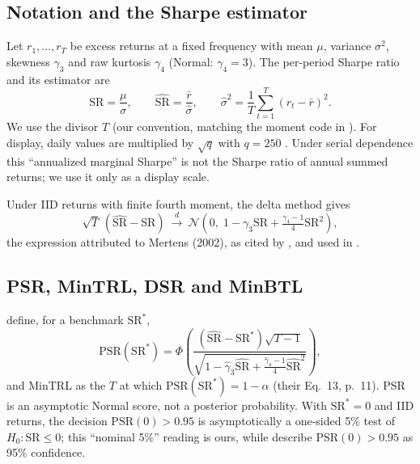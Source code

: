 \documentclass[11pt,a4paper]{article}
\newcommand{\SR}{\mathrm{SR}}
\newcommand{\hSR}{\widehat{\mathrm{SR}}}
\theoremstyle{remark}
\begin{document}
\subsection{Notation and the Sharpe estimator}
Let $r_1,\dots,r_T$ be excess returns at a fixed frequency with mean $\mu$, variance $\sigma^2$, skewness $\gamma_3$ and raw kurtosis $\gamma_4$ (Normal: $\gamma_4=3$). The per-period Sharpe ratio and its estimator are
\begin{equation}\label{eq:sr}
\SR=\frac{\mu}{\sigma},\qquad \hSR=\frac{\bar r}{\hat\sigma},\qquad \hat\sigma^2=\frac1T\sum_{t=1}^T(r_t-\bar r)^2 .
\end{equation}
We use the divisor $T$ (our convention, matching the moment code in \citealp[App.~A.4]{bailey2012frontier}). For display, daily values are multiplied by $\sqrt{q}$ with $q=250$ \citep[p.~10]{bailey2014dsr}. Under serial dependence this ``annualized marginal Sharpe'' is not the Sharpe ratio of annual summed returns; we use it only as a display scale.

Under IID returns with finite fourth moment, the delta method gives
\begin{equation}\label{eq:mertens}
\sqrt{T}\,(\hSR-\SR)\ \xrightarrow{d}\ \mathcal N\!\left(0,\;1-\gamma_3\SR+\tfrac{\gamma_4-1}{4}\SR^2\right),
\end{equation}
the expression attributed to Mertens (2002), as cited by \citet{bailey2012frontier}, and used in \citet[Eq.~8, p.~8]{bailey2012frontier}.

\subsection{PSR, MinTRL, DSR and MinBTL}
\citet[Eq.~11, p.~9]{bailey2012frontier} define, for a benchmark $\SR^\ast$,
\begin{equation}\label{eq:psr}
\mathrm{PSR}(\SR^\ast)=\Phi\!\left(\frac{(\hSR-\SR^\ast)\sqrt{T-1}}{\sqrt{1-\hat\gamma_3\hSR+\frac{\hat\gamma_4-1}{4}\hSR^2}}\right),
\end{equation}
and MinTRL as the $T$ at which $\mathrm{PSR}(\SR^\ast)=1-\alpha$ (their Eq.~13, p.~11). PSR is an asymptotic Normal score, not a posterior probability. With $\SR^\ast=0$ and IID returns, the decision $\mathrm{PSR}(0)>0.95$ is asymptotically a one-sided 5\% test of $H_0:\SR\le0$; this ``nominal 5\%'' reading is ours, while \citet[p.~12]{bailey2012frontier} describe $\mathrm{PSR}(0)>0.95$ as 95\% confidence.
\end{document}
